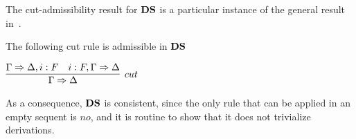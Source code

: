 The cut-admissibility result for $\mathbf{DS}$ is a particular instance of the general result in~\cite{DBLP:journals/apal/MarinMPV22}.
\begin{theorem}\label{thm:cut}
The following cut rule is admissible in $\mathbf{DS}$

\vspace{0.15cm}
\qquad\qquad\qquad\qquad$
\infer[cut]{\Gamma\seq\Delta}{\Gamma\seq\Delta,i: F  & i: F ,\Gamma\seq\Delta}
$
\end{theorem}
As a consequence, %
$\mathbf{DS}$ is consistent, since the only rule that can be applied in an empty sequent is $no$, and it is routine to show that it does not trivialize derivations. 



